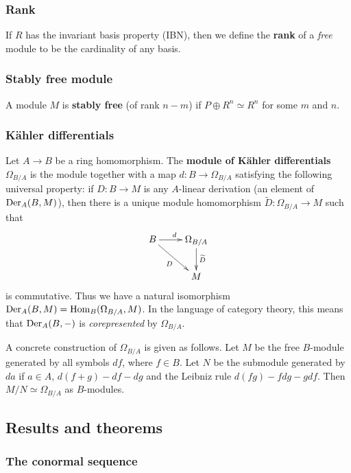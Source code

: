 \documentclass[11pt, english]{article}
\begin{document}
\subsubsection{Rank}
\label{lengthmodule}

If $R$ has the invariant basis property (IBN), then we define the \textbf{rank} of a \emph{free} module to be the cardinality of any basis.

\subsubsection{Stably free module}
\label{stablyfree}

A module $M$ is \textbf{stably free} (of rank $n-m$) if $P \oplus R^n \simeq R^n$ for some $m$ and $n$. 

\subsubsection{Kähler differentials}
\label{kahlerdifferentials}

Let $A \to B$ be a ring homomorphism. The \textbf{module of Kähler differentials} $\Omega_{B/A}$ is the module together with a map $d:B \to \Omega_{B/A}$ satisfying the following universal property: if $D:B \to M$ is any $A$-linear derivation (an element of $\operatorname{Der}_A(B,M)$), then there is a unique module homomorphism $\widetilde D:\Omega_{B/A} \to M$ such that
\[
\xymatrix{
B \ar[r]^d  \ar[dr]_D & \Omega_{B/A} \ar[d]^{\widetilde D} \\
 & M
}
\]
is commutative. Thus we have a natural isomorphism $\operatorname{Der}_A(B,M)=\operatorname{Hom}_B(\Omega_{B/A},M)$. In the language of category theory, this means that $\operatorname{Der}_A(B,-)$ is \emph{corepresented} by $\Omega_{B/A}$. 

A concrete construction of $\Omega_{B/A}$ is given as follows. Let $M$ be the free $B$-module generated by all symbols $df$, where $f \in B$. Let $N$ be the submodule generated by $da$ if $a \in A$, $d(f+g)-df-dg$ and the Leibniz rule $d(fg)-fdg-gdf$. Then $M/N \simeq \Omega_{B/A}$ as $B$-modules.

\subsection{Results and theorems}
\subsubsection{The conormal sequence}
\label{conormalsequence}
\end{document}
